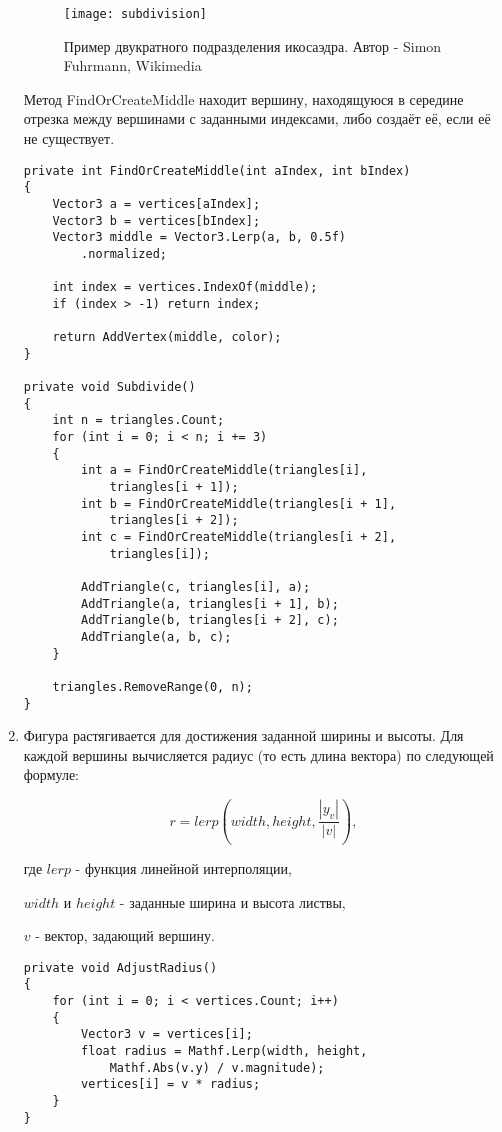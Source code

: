 \begin{enumerate}
\begin{figure}[h]
    \centering
    \texttt{[image: subdivision]}
    \caption{Пример двукратного подразделения икосаэдра. Автор - Simon Fuhrmann, Wikimedia}
\end{figure}
 
Метод FindOrCreateMiddle находит вершину, находящуюся в середине отрезка между вершинами с заданными индексами, либо создаёт её, если её не существует.
\begin{lstlisting}
private int FindOrCreateMiddle(int aIndex, int bIndex)
{
    Vector3 a = vertices[aIndex];
    Vector3 b = vertices[bIndex];
    Vector3 middle = Vector3.Lerp(a, b, 0.5f)
        .normalized;

    int index = vertices.IndexOf(middle);
    if (index > -1) return index;

    return AddVertex(middle, color);
}

private void Subdivide()
{
    int n = triangles.Count;
    for (int i = 0; i < n; i += 3)
    {
        int a = FindOrCreateMiddle(triangles[i], 
            triangles[i + 1]);
        int b = FindOrCreateMiddle(triangles[i + 1], 
            triangles[i + 2]);
        int c = FindOrCreateMiddle(triangles[i + 2], 
            triangles[i]);

        AddTriangle(c, triangles[i], a);
        AddTriangle(a, triangles[i + 1], b);
        AddTriangle(b, triangles[i + 2], c);
        AddTriangle(a, b, c);
    }

    triangles.RemoveRange(0, n);
}
\end{lstlisting}

\item Фигура растягивается для достижения заданной ширины и высоты. Для каждой вершины вычисляется радиус (то есть длина вектора) по следующей формуле:

\begin{equation}
    r = lerp\left(width, height, \frac{\left|y_{v}\right|}{|v|}\right),
\end{equation}

где $lerp$ - функция линейной интерполяции, 

$width$ и $height$ - заданные ширина и высота листвы,

$v$ - вектор, задающий вершину.

\begin{lstlisting}
private void AdjustRadius()
{
    for (int i = 0; i < vertices.Count; i++)
    {
        Vector3 v = vertices[i];
        float radius = Mathf.Lerp(width, height, 
            Mathf.Abs(v.y) / v.magnitude);
        vertices[i] = v * radius;
    }
}
\end{lstlisting}


\end{enumerate}
